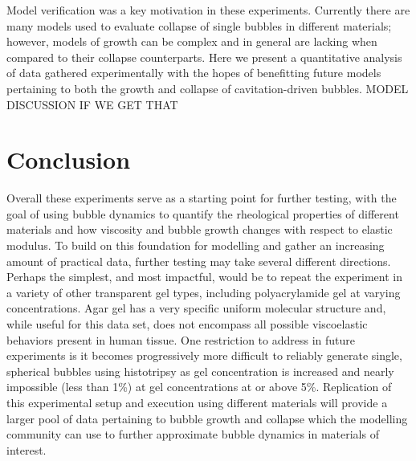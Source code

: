 \documentclass[prl,aps,epsf,twocolumn,superscriptaddress]{revtex4-1}
\begin{document}
Model verification was a key motivation in these experiments. Currently there are many models used to evaluate collapse of single bubbles in different materials; however, models of growth can be complex and in general are lacking when compared to their collapse counterparts. Here we present a quantitative analysis of data gathered experimentally with the hopes of benefitting future models pertaining to both the growth and collapse of cavitation-driven bubbles. MODEL DISCUSSION IF WE GET THAT
\section{Conclusion} %
Overall these experiments serve as a starting point for further testing, with the goal of using bubble dynamics to quantify the rheological properties of different materials and how viscosity and bubble growth changes with respect to elastic modulus. To build on this foundation for modelling and gather an increasing amount of practical data, further testing may take several different directions. Perhaps the simplest, and most impactful, would be to repeat the experiment in a variety of other transparent gel types, including polyacrylamide gel at varying concentrations. Agar gel has a very specific uniform molecular structure and, while useful for this data set, does not encompass all possible viscoelastic behaviors present in human tissue. One restriction to address in future experiments is it becomes progressively more difficult to reliably generate single, spherical bubbles using histotripsy as gel concentration is increased and nearly impossible (less than 1\%) at gel concentrations at or above 5\%. Replication of this experimental setup and execution using different materials will provide a larger pool of data pertaining to bubble growth and collapse which the modelling community can use to further approximate bubble dynamics in materials of interest. 

{}

\end{document}
